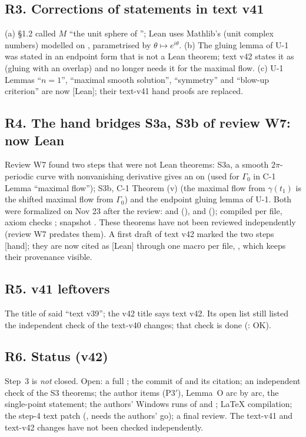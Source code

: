 \subsection*{R3. Corrections of statements in text v41}
(a)  \S1.2 called $M$ ``the unit sphere of ''; Lean uses Mathlib's  (unit complex numbers) modelled on , parametrised by $\theta\mapsto e^{i\theta}$. (b) The gluing lemma of U-1 was stated in an endpoint form that is not a Lean theorem; text v42 states it as  (gluing with an overlap) and no longer needs it for the maximal flow. (c) U-1 Lemmas ``$n=1$'', ``maximal smooth solution'', ``symmetry'' and ``blow-up criterion'' are now \textup{[Lean]}; their text-v41 hand proofs are replaced.
\subsection*{R4. The hand bridges S3a, S3b of review W7: now Lean}
Review W7 found two steps that were not Lean theorems: S3a, a smooth $2\pi$-periodic curve with nonvanishing derivative gives an  on  (used for $\Gamma_0$ in C-1 Lemma ``maximal flow''); S3b, C-1 Theorem (v) (the maximal flow from $\gamma(t_1)$ is the shifted maximal flow from $\Gamma_0$) and the endpoint gluing lemma of U-1. Both were formalized on Nov 23 after the review:  and  (),  and  (); compiled per file, axiom checks ; snapshot . These theorems have not been reviewed independently (review W7 predates them). A first draft of text v42 marked the two steps [hand]; they are now cited as [Lean] through one macro per file, , which keeps their provenance visible.
\subsection*{R5. v41 leftovers}
The title of  said ``text v39''; the v42 title says text v42. Its open list still listed the independent check of the text-v40 changes; that check is done (: OK).
\subsection*{R6. Status (v42)}
Step~3 is \emph{not} closed. Open: a full ; the commit of  and its citation; an independent check of the S3 theorems; the author items (P3$'$), Lemma~O arc by arc, the single-point statement; the authors' Windows runs of  and ; LaTeX compilation; the step-4 text patch (, needs the authors' go); a final review. The text-v41 and text-v42 changes have not been checked independently.

